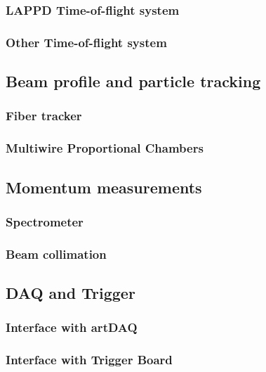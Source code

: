 \subsubsection{LAPPD Time-of-flight system}

\subsubsection{Other Time-of-flight system}

\subsection{Beam profile and particle tracking}

\subsubsection{Fiber tracker}

\subsubsection{Multiwire Proportional Chambers}

\subsection{Momentum measurements}

\subsubsection{Spectrometer}

\subsubsection{Beam collimation}

\subsection{DAQ and Trigger}

\subsubsection{Interface with artDAQ}

\subsubsection{Interface with Trigger Board}






